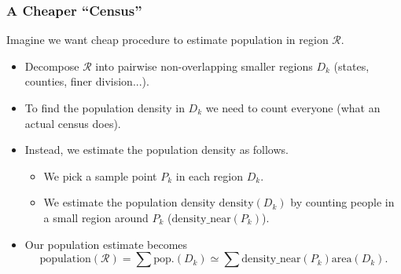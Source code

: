 \begin{frame}
\frametitle{A Cheaper ``Census''}
Imagine we want cheap procedure to estimate population in region $\mathcal{R}$.
\begin{itemize}
\item<2-> Decompose $\mathcal{R}$ into pairwise non-overlapping smaller regions $D_k$ (states, counties, finer division...).
\item<4-> To find the population density in $D_k$ we need to count everyone (what an actual census does).
\item<5-> Instead, we estimate the population density as follows.
\begin{itemize}
\item<6-> We pick a sample point $P_k$ in each region $D_k$.
\item<7-> We estimate the population density $\text{density}(D_k)$ by counting people in a small region around $P_k$ ($\text{density\_near}(P_k)$).
\end{itemize}
\item<8-> Our population estimate becomes
\[
\text{population}(\mathcal{R}) = \sum \text{pop.}(D_k) \simeq \sum \text{density\_near}(P_k) \text{area}(D_k).
\]
\end{itemize}
\end{frame}